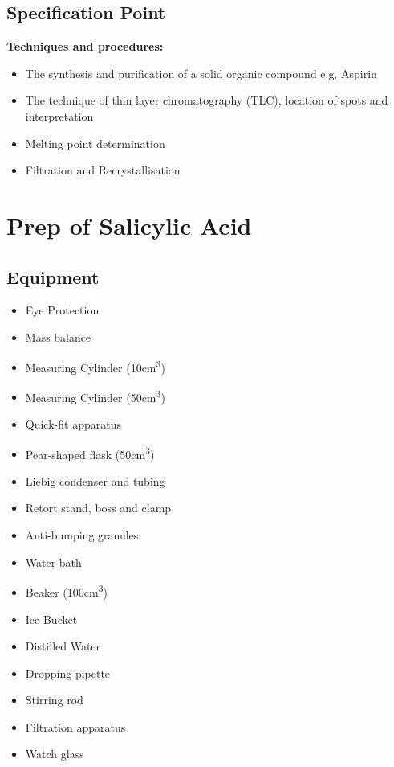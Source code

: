 \section{Specification Point}
\textbf{Techniques and procedures:}
\begin{itemize}
    \item The synthesis and purification of a solid organic compound e.g. Aspirin 
    \item The technique of thin layer chromatography (TLC), location of spots and interpretation
    \item Melting point determination
    \item Filtration and Recrystallisation
\end{itemize}


\chapter{Prep of Salicylic Acid}
\section{Equipment}
\begin{small}
\begin{multicols}{2}
\begin{itemize}
    \item Eye Protection
    \item Mass balance
    \item Measuring Cylinder (10\si{\centi\meter\cubed})
    \item Measuring Cylinder (50\si{\centi\meter\cubed})
    \item Quick-fit apparatus
    \item Pear-shaped flask (50\si{\centi\meter\cubed})
    \item Liebig condenser and tubing
    \item Retort stand, boss and clamp
\end{itemize}
\columnbreak
\begin{itemize}
    \item Anti-bumping granules
    \item Water bath
    \item Beaker (100\si{\centi\meter\cubed})
    \item Ice Bucket
    \item Distilled Water
    \item Dropping pipette
    \item Stirring rod
    \item Filtration apparatus
    \item Watch glass
\end{itemize}
\end{multicols}
\end{small}



